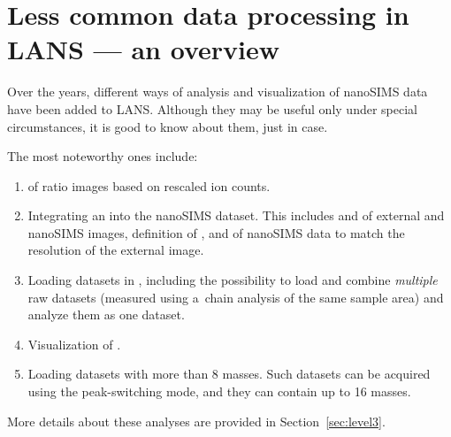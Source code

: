\section{Less common data processing in LANS --- an overview}

\purplebox{}
Over the years, different ways of analysis and visualization of nanoSIMS data have been added to LANS. Although they may be useful only under special circumstances, it is good to know about them, just in case. 
\tcbe

\noindent
The most noteworthy ones include:

\begin{enumerate}

\item {} of ratio images based on rescaled ion counts.

\item Integrating an  into the nanoSIMS dataset. This includes  and  of external and nanoSIMS images, definition of , and  of nanoSIMS data to match the resolution of the external image.

\item Loading datasets in , including the possibility to load and combine \emph{multiple} raw datasets (measured using a~chain analysis of the same sample area) and analyze them as one dataset.

\item Visualization of .

\item Loading datasets with more than 8 masses. Such datasets can be acquired using the peak-switching mode, and they can contain up to 16 masses.


\end{enumerate}
%
More details about these analyses are provided in Section~\ref{sec:level3}.
